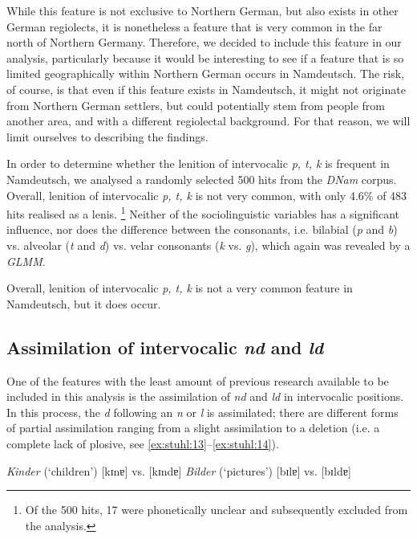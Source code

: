 \documentclass[output=paper]{langsci/langscibook}
\begin{document}
While this feature is not exclusive to Northern German, but also exists in other German regiolects, it is nonetheless a feature that is very common in the far north of Northern Germany. Therefore, we decided to include this feature in our analysis, particularly because it would be interesting to see if a feature that is so limited geographically within Northern German occurs in Namdeutsch. The risk, of course, is that even if this feature exists in Namdeutsch, it might not originate from Northern German settlers, but could potentially stem from people from another area, and with a different regiolectal background. For that reason, we will limit ourselves to describing the findings.

In order to determine whether the lenition of intervocalic \textit{p, t, k} is frequent in Namdeutsch, we analysed a randomly selected 500 hits from the \textit{DNam} corpus. Overall, lenition of intervocalic \textit{p, t, k} is not very common, with only 4.6\% of 483 hits realised as a lenis.{} \footnote{Of the 500 hits, 17 were phonetically unclear and subsequently excluded from the analysis.} Neither of the sociolinguistic variables has a significant influence, nor does the difference between the consonants, i.e. bilabial (\textit{p} and \textit{b}) vs. alveolar (\textit{t} and \textit{d}) vs. velar consonants (\textit{k} vs. \textit{g}), which again was revealed by a \textit{GLMM}. 

Overall, lenition of intervocalic \textit{p, t, k} is not a very common feature in Namdeutsch, but it does occur. 

\subsection{Assimilation of intervocalic \textit{nd} and \textit{ld}}
\label{sec:stuhl:4.6}

One of the features with the least amount of previous research available to be included in this analysis is the assimilation of \textit{nd} and \textit{ld} in intervocalic positions. In this process, the \textit{d} following an \textit{n} or \textit{l} is assimilated; there are different forms of partial assimilation ranging from a slight assimilation to a deletion (i.e. a complete lack of plosive, see \ref{ex:stuhl:13}--\ref{ex:stuhl:14}).

 
\ea
\label{ex:stuhl:13}  
\textit{Kinder} (‘children’) {[kɪnɐ]} vs. {[kɪndɐ]}
\ex
\label{ex:stuhl:14}  
\textit{Bilder} (‘pictures’) {[bɪlɐ]} vs. {[bɪldɐ]}
\z
 
\end{document}
